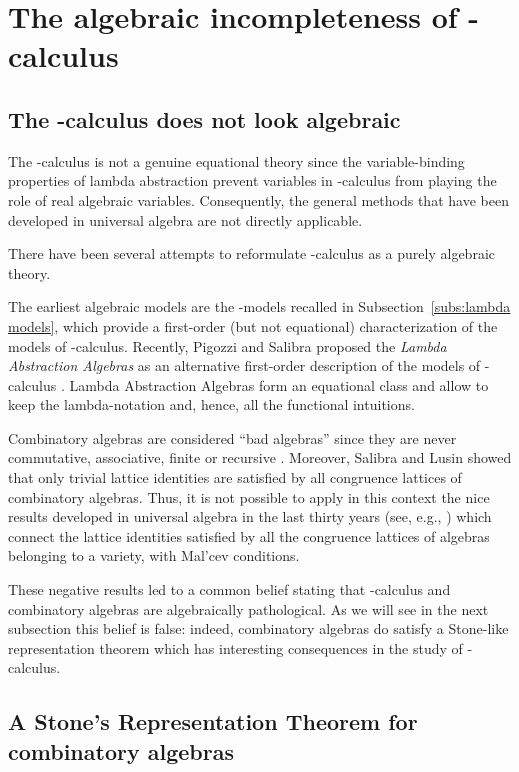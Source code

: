 \documentclass[english]{llncs}
\begin{document}
\section{The algebraic incompleteness of -calculus}\label{sec:The algebraic incompleteness of gl-calculus}

\subsection{The -calculus does not look algebraic}

The -calculus is not a genuine equational theory since the variable-binding properties of lambda abstraction prevent 
variables in -calculus from playing the role of real algebraic variables.
Consequently, the general methods that have been de\-ve\-lo\-ped in universal algebra are not directly applicable.

There have been several attempts to reformulate -calculus as a purely algebraic theory.

The earliest algebraic models are the -models recalled in Subsection~\ref{subs:lambda models},
which provide a first-order (but not equational) characterization of the models of -calculus.
Recently, Pigozzi and Salibra proposed the \emph{Lambda Abstraction Algebras} as an alternative first-order 
description of the models of -calculus \cite{PigozziS98,Salibra00}.
Lambda Abstraction Algebras form an equational class and allow to keep the lambda-notation and, hence, all the functional intuitions. 

Combinatory algebras are considered ``bad algebras'' since they are never commutative, associative, finite or recursive \cite[Prop.~5.1.15]{Bare}.
Moreover, Salibra and Lusin \cite{LusinS04} showed that only trivial lattice identities are satisfied by all congruence lattices of combinatory algebras. 
Thus, it is not possible to apply in this context the nice results developed in universal algebra in the last thirty years 
(see, e.g., \cite{BurrisS81,McKenzieMT87}) which connect the lattice identities satisfied by all the congruence lattices of algebras belonging 
to a variety, with Mal'cev conditions.

These negative results led to a common belief stating that -calculus and combinatory algebras are algebraically pathological.
As we will see in the next subsection this belief is false: indeed, combinatory algebras do satisfy a Stone-like representation theorem 
which has interesting consequences in the study of -calculus.

\subsection{A Stone's Representation Theorem for combinatory algebras}
\end{document}

